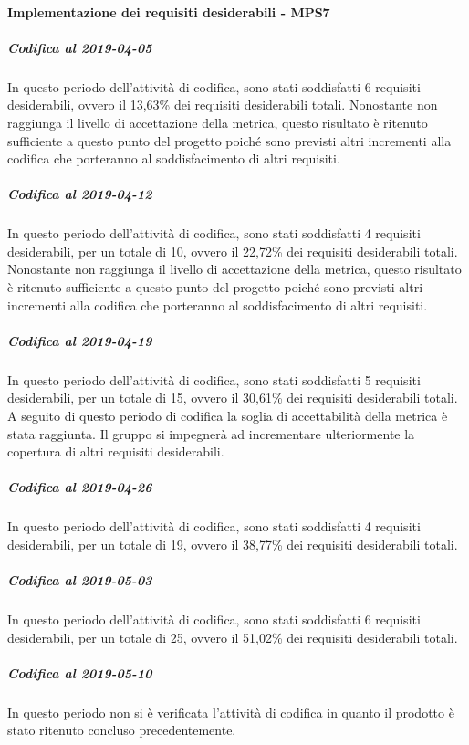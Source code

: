 \paragraph{Implementazione dei requisiti desiderabili - MPS7}
\subparagraph{Codifica al 2019-04-05}
In questo periodo dell'attività di codifica, sono stati soddisfatti 6 requisiti desiderabili, ovvero il 13,63\% dei requisiti desiderabili totali.
Nonostante non raggiunga il livello di accettazione della
metrica, questo risultato è ritenuto sufficiente a questo punto del progetto poiché sono previsti altri incrementi alla codifica che porteranno al soddisfacimento di altri requisiti.

\subparagraph{Codifica al 2019-04-12}
In questo periodo dell'attività di codifica, sono stati soddisfatti 4 requisiti desiderabili, per un totale di 10, ovvero il 22,72\% dei requisiti desiderabili totali.
Nonostante non raggiunga il livello di accettazione della
metrica, questo risultato è ritenuto sufficiente a questo punto del progetto poiché sono previsti altri incrementi alla codifica che porteranno al soddisfacimento di altri requisiti.

\subparagraph{Codifica al 2019-04-19}
In questo periodo dell'attività di codifica, sono stati soddisfatti 5 requisiti desiderabili, per un totale di 15, ovvero il 30,61\% dei requisiti desiderabili totali.
A seguito di questo periodo di codifica la soglia di accettabilità della metrica è stata raggiunta.
Il gruppo si impegnerà ad incrementare ulteriormente la copertura di altri requisiti desiderabili.

\subparagraph{Codifica al 2019-04-26}
In questo periodo dell'attività di codifica, sono stati soddisfatti 4 requisiti desiderabili, per un totale di 19, ovvero il 38,77\% dei requisiti desiderabili totali.

\subparagraph{Codifica al 2019-05-03}
In questo periodo dell'attività di codifica, sono stati soddisfatti 6 requisiti desiderabili, per un totale di 25, ovvero il 51,02\% dei requisiti desiderabili totali.

\subparagraph{Codifica al 2019-05-10}
In questo periodo non si è verificata l'attività di codifica in quanto il prodotto è stato ritenuto concluso precedentemente.


